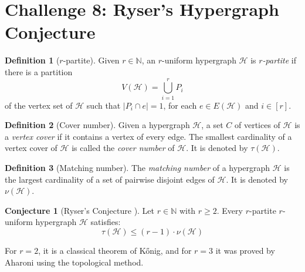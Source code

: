 \documentclass[12pt]{article}
\numberwithin{equation}{section}
\theoremstyle{definition}
\newtheorem{definition}{Definition}
\newtheorem{conjecture}[theorem]{Conjecture}
\newcommand{\ev}[1]{( #1 )}
\begin{document}
\section*{Challenge 8: Ryser's Hypergraph Conjecture}

\begin{definition}[$r$-partite]
Given $r\in \mathbb{N}$, an $r$-uniform hypergraph $\mathcal{H}$ is \emph{$r$-partite} if there is a partition
$$
V\ev{\mathcal{H}} = \bigcup_{i=1}^{r} P_i
$$
of the vertex set of $\mathcal{H}$ such that $|P_i \cap e| = 1$, for each $e\in E\ev{\mathcal{H}}$ and $i\in [r]$. 
\end{definition}

\begin{definition}[Cover number]
Given a hypergraph $\mathcal{H}$, a
set $C$ of vertices of $\mathcal{H}$ is a \textit{vertex cover} if it contains a vertex of every edge. The smallest cardinality of a vertex cover of $\mathcal{H}$ is called the \textit{cover number} of $\mathcal{H}$. It is denoted by $\tau(\mathcal{H})$.
\end{definition}

\begin{definition}[Matching number]
The \textit{matching number} of a hypergraph $\mathcal{H}$ is the largest cardinality of a set of pairwise disjoint edges of $\mathcal{H}$. It is denoted by $\nu\ev{\mathcal{H}}$.
\end{definition}

\begin{conjecture}[Ryser's Conjecture \mbox{\cite{bishnoi}}]
Let $r\in \mathbb{N}$ with $r\geq 2$. Every $r$-partite $r$-uniform hypergraph $\mathcal{H}$ satisfies:
$$
\tau\ev{\mathcal{H}} \leq \ev{r-1} \cdot \nu\ev{\mathcal{H}}
$$

\end{conjecture}

For $r=2$, it is a classical theorem of K\H{o}nig, and for $r=3$ it was proved by Aharoni \cite{AharoniRyserTripartite} using the topological method. 

\printbibliography
\end{document}
